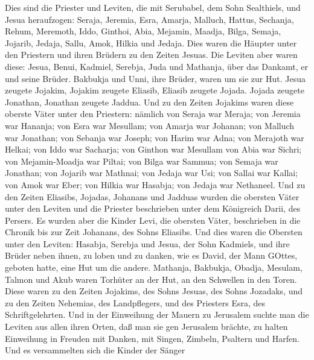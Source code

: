  Dies sind die Priester und Leviten, die mit Serubabel, dem
Sohn Sealthiels, und Jesua heraufzogen: Seraja, Jeremia, Esra,
 Amarja, Malluch, Hattus,  Sechanja, Rehum,
Meremoth,  Iddo, Ginthoi, Abia,  Mejamin,
Maadja, Bilga,  Semaja, Jojarib, Jedaja,  Sallu,
Amok, Hilkia und Jedaja. Dies waren die Häupter unter den Priestern und
ihren Brüdern zu den Zeiten Jesuas.  Die Leviten aber waren
diese: Jesua, Benui, Kadmiel, Serebja, Juda und Mathanja, über das
Dankamt, er und seine Brüder.  Bakbukja und Unni, ihre
Brüder, waren um sie zur Hut.  Jesua zeugete Jojakim,
Jojakim zeugete Eliasib, Eliasib zeugete Jojada.  Jojada
zeugete Jonathan, Jonathan zeugete Jaddua.  Und zu den
Zeiten Jojakims waren diese oberste Väter unter den Priestern: nämlich
von Seraja war Meraja; von Jeremia war Hananja;  von Esra
war Mesullam; von Amarja war Johanan;  von Malluch war
Jonathan; von Sebanja war Joseph;  von Harim war Adna; von
Merajoth war Helkai;  von Iddo war Sacharja; von Ginthon
war Mesullam  von Abia war Sichri; von Mejamin-Moadja war
Piltai;  von Bilga war Sammua; von Semaja war Jonathan;
 von Jojarib war Mathnai; von Jedaja war Usi; 
von Sallai war Kallai; von Amok war Eber;  von Hilkia war
Hasabja; von Jedaja war Nethaneel.  Und zu den Zeiten
Eliasibs, Jojadas, Johanans und Jadduas wurden die obersten Väter unter
den Leviten und die Priester beschrieben unter dem Königreich Darii, des
Persers.  Es wurden aber die Kinder Levi, die obersten
Väter, beschrieben in die Chronik bis zur Zeit Johanans, des Sohns
Eliasibs.  Und dies waren die Obersten unter den Leviten:
Hasabja, Serebja und Jesua, der Sohn Kadmiels, und ihre Brüder neben
ihnen, zu loben und zu danken, wie es David, der Mann GOttes, geboten
hatte, eine Hut um die andere.  Mathanja, Bakbukja, Obadja,
Mesulam, Talmon und Akub waren Torhüter an der Hut, an den Schwellen in
den Toren.  Diese waren zu den Zeiten Jojakims, des Sohns
Jesuas, des Sohns Jozadaks, und zu den Zeiten Nehemias, des
Landpflegers, und des Priesters Esra, des Schriftgelehrten.
 Und in der Einweihung der Mauern zu Jerusalem suchte man
die Leviten aus allen ihren Orten, daß man sie gen Jerusalem brächte, zu
halten Einweihung in Freuden mit Danken, mit Singen, Zimbeln, Psaltern
und Harfen.  Und es versammelten sich die Kinder der Sänger

